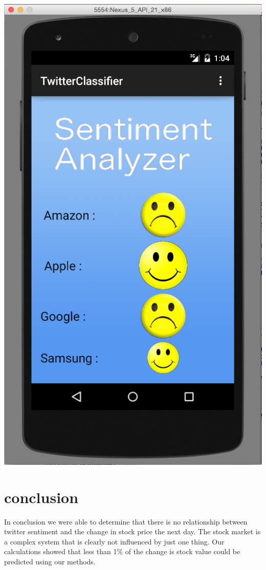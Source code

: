 \documentclass{acm_proc_article-sp}
\begin{document}
\includegraphics[width=\linewidth]{android.png}

\section{conclusion}

In conclusion we were able to determine that there is no relationship between
twitter sentiment and the change in stock price the next day. The stock market
is a complex system that is clearly not influenced by just one thing. Our calculations
showed that less than 1\% of the change is stock value could be predicted using our
methods. 
\end{document}
